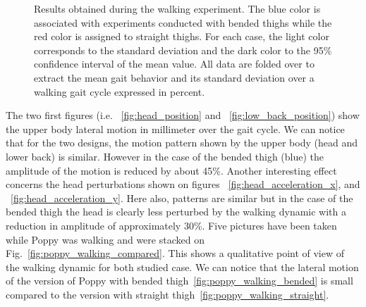 \begin{figure}[h]
    \hfil
    \hfil
    \hfil
    \hfil
    \hfil
    \caption{Results obtained during the walking experiment.
    The blue color is associated with experiments conducted with bended thighs while the red color is assigned to straight thighs.
    For each case, the light color corresponds to the standard deviation and the dark color to the 95\% confidence interval of the mean value.
    All data are folded over to extract the mean gait behavior and its standard deviation over a walking gait cycle expressed in percent.}
    \label{fig:walk_result}
\end{figure}

The two first figures (i.e. ~\ref{fig:head_position} and ~\ref{fig:low_back_position}) show the upper body lateral motion in millimeter over the gait cycle. We can notice that for the two designs, the motion pattern shown by the upper body (head and lower back) is similar. However in the case of the bended thigh (blue) the amplitude of the motion is reduced by about 45\%. Another interesting effect concerns the head perturbations shown on figures ~\ref{fig:head_acceleration_x}, and ~\ref{fig:head_acceleration_y}. Here also, patterns are similar but in the case of the bended thigh the head is clearly less perturbed by the walking dynamic with a reduction in amplitude of approximately 30\%. Five pictures have been taken while Poppy was walking and were stacked on Fig.~\ref{fig:poppy_walking_compared}. This shows a qualitative point of view of the walking dynamic for both studied case.
We can notice that the lateral motion of the version of Poppy with bended thigh~\ref{fig:poppy_walking_bended} is small compared to the version with straight thigh~\ref{fig:poppy_walking_straight}.



